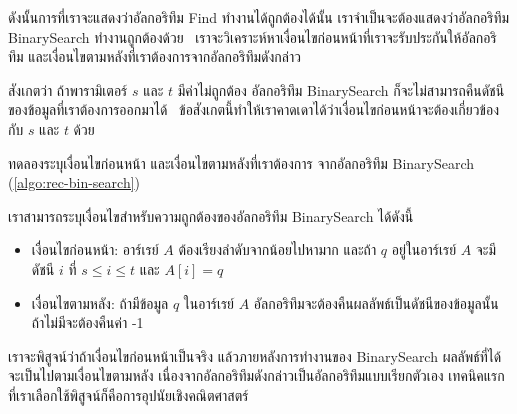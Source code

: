 ดังนั้น{\wbr}การ{\wbr}ที่{\wbr}เรา{\wbr}จะ{\wbr}แสดง{\wbr}ว่า{\wbr}อัล{\wbr}กอ{\wbr}ริ{\wbr}ทึม Find ทำงาน{\wbr}ได้{\wbr}ถูกต้อง{\wbr}ได้{\wbr}นั้น{\wbr}
เรา{\wbr}จำเป็น{\wbr}จะ{\wbr}ต้อง{\wbr}แสดง{\wbr}ว่า{\wbr}อัล{\wbr}กอ{\wbr}ริ{\wbr}ทึม BinarySearch ทำงาน{\wbr}ถูกต้อง{\wbr}ด้วย{\wbr}
\ เรา{\wbr}จะ{\wbr}วิเคราะห์{\wbr}หา{\wbr}เงื่อนไข{\wbr}ก่อนหน้า{\wbr}ที่{\wbr}เรา{\wbr}จะ{\wbr}รับประกัน{\wbr}ให้{\wbr}อัล{\wbr}กอ{\wbr}ริ{\wbr}ทึม{\wbr}
และ{\wbr}เงื่อนไข{\wbr}ตาม{\wbr}หลัง{\wbr}ที่{\wbr}เรา{\wbr}ต้องการ{\wbr}จาก{\wbr}อัล{\wbr}กอ{\wbr}ริ{\wbr}ทึม{\wbr}ดังกล่าว{\wbr}

สังเกต{\wbr}ว่า ถ้า{\wbr}พารามิเตอร์ $s$ และ $t$ มี{\wbr}ค่า{\wbr}ไม่{\wbr}ถูกต้อง อัล{\wbr}กอ{\wbr}ริ{\wbr}ทึม BinarySearch
ก็{\wbr}จะ{\wbr}ไม่{\wbr}สามารถ{\wbr}คืน{\wbr}ดัชนี{\wbr}ของ{\wbr}ข้อมูล{\wbr}ที่{\wbr}เรา{\wbr}ต้องการ{\wbr}ออก{\wbr}มา{\wbr}ได้{\wbr}
\ ข้อสังเกต{\wbr}นี้{\wbr}ทำ{\wbr}ให้{\wbr}เรา{\wbr}คาดเดา{\wbr}ได้{\wbr}ว่า{\wbr}เงื่อนไข{\wbr}ก่อนหน้า{\wbr}จะ{\wbr}ต้อง{\wbr}เกี่ยวข้อง{\wbr}กับ $s$ และ $t$ ด้วย{\wbr}

\begin{quiz}{}
ทดลอง{\wbr}ระบุ{\wbr}เงื่อนไข{\wbr}ก่อนหน้า และ{\wbr}เงื่อนไข{\wbr}ตาม{\wbr}หลัง{\wbr}ที่{\wbr}เรา{\wbr}ต้องการ จาก{\wbr}อัล{\wbr}กอ{\wbr}ริ{\wbr}ทึม BinarySearch
(\ref{algo:rec-bin-search})
\end{quiz}

เรา{\wbr}สามารถ{\wbr}ระบุ{\wbr}เงื่อนไข{\wbr}สำหรับ{\wbr}ความ{\wbr}ถูกต้อง{\wbr}ของ{\wbr}อัล{\wbr}กอ{\wbr}ริ{\wbr}ทึม BinarySearch ได้{\wbr}ดังนี้{\wbr}
\begin{itemize}
\item เงื่อนไข{\wbr}ก่อนหน้า: อาร์เรย์ $A$ ต้อง{\wbr}เรียงลำดับ{\wbr}จาก{\wbr}น้อย{\wbr}ไป{\wbr}หา{\wbr}มาก และ{\wbr}ถ้า $q$ อยู่{\wbr}ใน{\wbr}อาร์เรย์ $A$ จะ{\wbr}มี{\wbr}ดัชนี $i$ ที่ $s\leq i\leq t$ และ $A[i]=q$
\item เงื่อนไข{\wbr}ตาม{\wbr}หลัง: ถ้า{\wbr}มี{\wbr}ข้อมูล $q$ ใน{\wbr}อาร์เรย์ $A$
  อัล{\wbr}กอ{\wbr}ริ{\wbr}ทึม{\wbr}จะ{\wbr}ต้อง{\wbr}คืน{\wbr}ผลลัพธ์{\wbr}เป็น{\wbr}ดัชนี{\wbr}ของ{\wbr}ข้อมูล{\wbr}นั้น ถ้า{\wbr}ไม่{\wbr}มี{\wbr}จะ{\wbr}ต้อง{\wbr}คืน{\wbr}ค่า -1
\end{itemize}

เรา{\wbr}จะ{\wbr}พิสูจน์{\wbr}ว่า{\wbr}ถ้า{\wbr}เงื่อนไข{\wbr}ก่อนหน้า{\wbr}เป็นจริง แล้ว{\wbr}ภายหลัง{\wbr}การ{\wbr}ทำงาน{\wbr}ของ BinarySearch
ผลลัพธ์{\wbr}ที่{\wbr}ได้{\wbr}จะ{\wbr}เป็น{\wbr}ไป{\wbr}ตาม{\wbr}เงื่อนไข{\wbr}ตาม{\wbr}หลัง{\wbr}
เนื่องจาก{\wbr}อัล{\wbr}กอ{\wbr}ริ{\wbr}ทึม{\wbr}ดังกล่าว{\wbr}เป็น{\wbr}อัล{\wbr}กอ{\wbr}ริ{\wbr}ทึม{\wbr}แบบ{\wbr}เรียก{\wbr}ตัวเอง{\wbr}
เทคนิค{\wbr}แรก{\wbr}ที่{\wbr}เรา{\wbr}เลือก{\wbr}ใช้{\wbr}พิสูจน์{\wbr}ก็{\wbr}คือ{\wbr}การ{\wbr}อุปนัย{\wbr}เชิง{\wbr}คณิตศาสตร์ 

